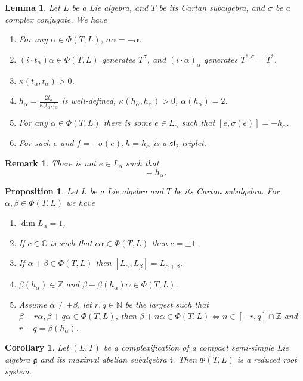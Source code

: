 \documentclass{article}
\newtheorem{proposition}{Proposition}[section]
\newtheorem{lemma}{Lemma}[section]
\newtheorem{remark}{Remark}[section]
\newtheorem{corollary}{Corollary}[section]
\numberwithin{equation}{section}
\begin{document}
\begin{lemma}
Let $L$ be a Lie algebra, and $T$ be its Cartan subalgebra, and $\sigma$ be a complex conjugate. We have
\begin{enumerate}
\item For any $\alpha\in\Phi(T,L)$, $\sigma\alpha=-\alpha$.
\item $(i\cdot t_\alpha)\alpha\in\Phi(T,L)$ generates $T^\sigma$, and $(i\cdot\alpha)_\alpha$ generates $T^{*,\sigma} = T^*$.
\item $\kappa(t_\alpha,t_\alpha)>0$.
\item $h_\alpha = {\frac {2t_\alpha} {\kappa(t_\alpha,t_\alpha}}$ is well-defined, $\kappa(h_\alpha,h_\alpha)>0$, $\alpha(h_\alpha)=2$.
\item For any $\alpha\in\Phi(T,L)$ there is some $e\in L_\alpha$ such that $[e,\sigma(e)]=-h_{\alpha}$.
\item For such $e$ and $f=-\sigma(e),h=h_\alpha$ is a $\mathfrak{sl}_2$-triplet.
\end{enumerate}
\end{lemma}

\begin{remark}
There is not $e\in L_\alpha$ such that
\begin{equation*}
[e,\sigma(e)] = h_\alpha.
\end{equation*}
\end{remark}

\begin{proposition}
Let $L$ be a Lie algebra and $T$ be its Cartan subalgebra. For $\alpha,\beta\in\Phi(T,L)$ we have
\begin{enumerate}
\item $\dim L_\alpha = 1$,
\item If $c\in\mathbb{C}$ is such that $c\alpha\in \Phi(T,L)$ then $c=\pm1$.
\item If $\alpha+\beta\in\Phi(T,L)$ then $[L_\alpha,L_\beta] = L_{\alpha+\beta}$.
\item $\beta(h_\alpha)\in\mathbb{Z}$ and $\beta-\beta(h_\alpha)\alpha\in\Phi(T,L)$.
\item Assume $\alpha\not=\pm\beta$, let $r,q\in\mathbb{N}$ be the largest such that $\beta-r\alpha,\beta+q\alpha\in\Phi(T,L)$, then $\beta+n\alpha\in\Phi(T,L)\Leftrightarrow n\in[-r,q]\cap\mathbb{Z}$ and $r-q = \beta(h_\alpha)$.
\end{enumerate}
\label{root_system_property_lie_algebra}
\end{proposition}

\begin{corollary}
Let $(L,T)$ be a complexification of a compact semi-simple Lie algebra $\mathfrak{g}$ and its maximal abelian subalgebra $\mathfrak{t}$. Then $\Phi(T,L)$ is a reduced root system.
\end{corollary}
\end{document}
